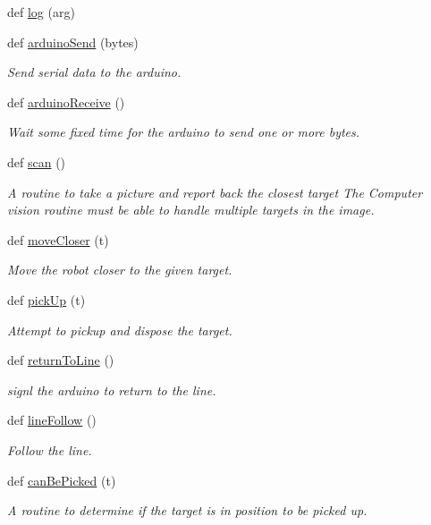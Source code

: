 \begin{DoxyCompactItemize}
\item 
def \mbox{\hyperlink{namespaceSyringenator_a263a26fdb4da94f277fb51f3e740f30d}{log}} (arg)
\item 
def \mbox{\hyperlink{namespaceSyringenator_ae7978d5b84170226249d8de2e204e762}{arduino\+Send}} (bytes)
\begin{DoxyCompactList}\small\item\em Send serial data to the arduino. \end{DoxyCompactList}\item 
def \mbox{\hyperlink{namespaceSyringenator_a1c5a8cf020e400c8c0337977a5b6d921}{arduino\+Receive}} ()
\begin{DoxyCompactList}\small\item\em Wait some fixed time for the arduino to send one or more bytes. \end{DoxyCompactList}\item 
def \mbox{\hyperlink{namespaceSyringenator_aff01237d3ff3e33f0ffc32927d813df0}{scan}} ()
\begin{DoxyCompactList}\small\item\em A routine to take a picture and report back the closest target The Computer vision routine must be able to handle multiple targets in the image. \end{DoxyCompactList}\item 
def \mbox{\hyperlink{namespaceSyringenator_a6aecf5518c352d012eb1422d9970146d}{move\+Closer}} (t)
\begin{DoxyCompactList}\small\item\em Move the robot closer to the given target. \end{DoxyCompactList}\item 
def \mbox{\hyperlink{namespaceSyringenator_a9409dbfa8ede969288bb659ef23befb6}{pick\+Up}} (t)
\begin{DoxyCompactList}\small\item\em Attempt to pickup and dispose the target. \end{DoxyCompactList}\item 
def \mbox{\hyperlink{namespaceSyringenator_afe04905c8a4a9d077457422866633203}{return\+To\+Line}} ()
\begin{DoxyCompactList}\small\item\em signl the arduino to return to the line. \end{DoxyCompactList}\item 
def \mbox{\hyperlink{namespaceSyringenator_a824ef6e71bc0975483435ffbdd58cb3e}{line\+Follow}} ()
\begin{DoxyCompactList}\small\item\em Follow the line. \end{DoxyCompactList}\item 
def \mbox{\hyperlink{namespaceSyringenator_acb08d40f080a03cb4e7a43ee3ab4854b}{can\+Be\+Picked}} (t)
\begin{DoxyCompactList}\small\item\em A routine to determine if the target is in position to be picked up. \end{DoxyCompactList}\end{DoxyCompactItemize}
